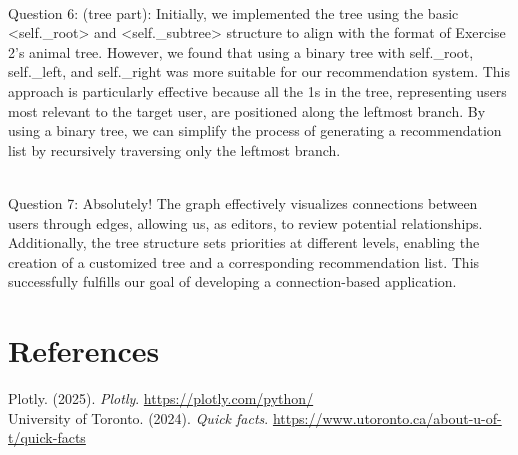\documentclass[fontsize=11pt]{article}
\begin{document}
\\
Question 6: 
(tree part): Initially, we implemented the tree using the basic <self._root> and <self._subtree> structure to align with the format of Exercise 2's animal tree. However, we found that using a binary tree with self._root, self._left, and self._right was more suitable for our recommendation system. This approach is particularly effective because all the 1s in the tree, representing users most relevant to the target user, are positioned along the leftmost branch. By using a binary tree, we can simplify the process of generating a recommendation list by recursively traversing only the leftmost branch.


\\
Question 7:
Absolutely! The graph effectively visualizes connections between users through edges, allowing us, as editors, to review potential relationships. Additionally, the tree structure sets priorities at different levels, enabling the creation of a customized tree and a corresponding recommendation list. This successfully fulfills our goal of developing a connection-based application.


\section*{References}

Plotly. (2025). \textit{Plotly}.
\url{https://plotly.com/python/}
\\
University of Toronto. (2024). \textit{Quick facts}.
\url{https://www.utoronto.ca/about-u-of-t/quick-facts}


\end{document}
